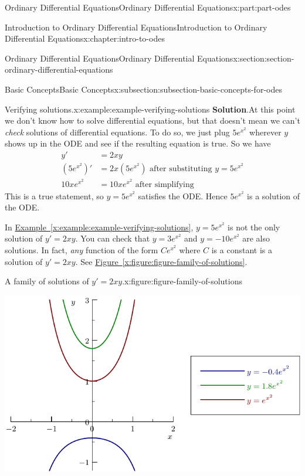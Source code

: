 \documentclass[twoside,10pt,]{book}
\newcommand{\blocktitlefont}{\relax}
\newcommand{\xreffont}{\relax}
\numberwithin{equation}{part}
\begin{document}
\begin{partptx}{Ordinary Differential Equations}{}{Ordinary Differential Equations}{}{}{x:part:part-odes}
\begin{chapterptx}{Introduction to Ordinary Differential Equations}{}{Introduction to Ordinary Differential Equations}{}{}{x:chapter:intro-to-odes}
\begin{sectionptx}{Ordinary Differential Equations}{}{Ordinary Differential Equations}{}{}{x:section:section-ordinary-differential-equations}
\begin{subsectionptx}{Basic Concepts}{}{Basic Concepts}{}{}{x:subsection:subsection-basic-concepts-for-odes}
\begin{example}{Verifying solutions.}{x:example:example-verifying-solutions}
\noindent\textbf{\blocktitlefont Solution}.\hypertarget{g:solution:idp105548816122784}{}\quad{}At this point we don't know how to solve differential equations, but that doesn't mean we can't \emph{check} solutions of differential equations. To do so, we just plug \(5e^{x^{2}}\) wherever \(y\) shows up in the ODE and see if the resulting equation is true. So we have%
\begin{align*}
y' & = 2xy \\
(5e^{x^{2}})' & = 2x(5e^{x^{2}}) \text{ after substituting }y = 5e^{x^{2}}\\
10xe^{x^{2}} & = 10xe^{x^{2}} \text{ after simplifying} 
\end{align*}
This is a true statement, so \(y = 5e^{x^{2}}\) satisfies the ODE. Hence \(5e^{x^{2}}\) is a solution of the ODE.%
\end{example}
In \hyperref[x:example:example-verifying-solutions]{Example~{\xreffont\ref{x:example:example-verifying-solutions}}}, \(y = 5e^{x^{2}}\) is not the only solution of \(y' = 2xy\). You can check that \(y = 3e^{x^{2}}\) and \(y = -10e^{x^{2}}\) are also solutions. In fact, \emph{any} function of the form \(Ce^{x^{2}}\) where \(C\) is a constant is a solution of \(y' = 2xy\). See \hyperref[x:figure:figure-family-of-solutions]{Figure~{\xreffont\ref{x:figure:figure-family-of-solutions}}}.%
\begin{figureptx}{A family of solutions of \(y' = 2xy\).}{x:figure:figure-family-of-solutions}{}%
\begin{image}{0}{1}{0}%
\includegraphics[width=\linewidth]{generated/asymptote/image-1.pdf}
\end{image}%
\tcblower
\end{figureptx}%

\end{subsectionptx}
\end{sectionptx}
\end{chapterptx}
\end{partptx}
\end{document}
